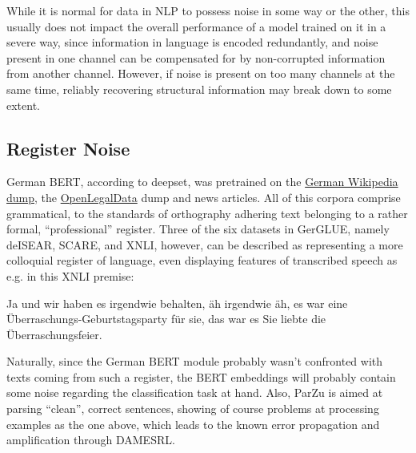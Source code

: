 While it is normal for data in NLP to possess noise in some way or the other, this usually does
not impact the overall performance of a model trained on it in a severe way, since information
in language is encoded redundantly, and noise present in one channel can be compensated for by
non-corrupted information from another channel. However, if noise
is present on too many channels at the same time, reliably recovering structural information may
break down to some extent.



\subsection{Register Noise}
\label{sec:register-noise}

German BERT, according to deepset, was pretrained on the
\href{https://dumps.wikimedia.org/dewiki/}{German Wikipedia dump}, the
\href{http://openlegaldata.io/research/2019/02/19/court-decision-dataset.html}{OpenLegalData}
dump and news articles. All of this corpora comprise grammatical, to the standards of
orthography adhering text belonging to a rather formal, ``professional'' register. Three
of the six datasets in GerGLUE, namely deISEAR, SCARE, and XNLI, however, can be described
as representing a more colloquial register of language, even displaying features of
transcribed speech as e.g. in this XNLI premise:

\begin{examples}
  \item Ja und wir haben es irgendwie behalten, äh irgendwie äh, es war eine Überraschungs-Geburtstagsparty für sie, das war es Sie liebte die Überraschungsfeier.
\end{examples}

Naturally, since the German BERT module probably wasn't confronted with texts coming from such a register,
the BERT embeddings will probably contain some noise regarding the classification task at hand. Also, ParZu
is aimed at parsing ``clean'', correct sentences, showing of course problems at processing examples as the
one above, which leads to the known error propagation and amplification through DAMESRL.

